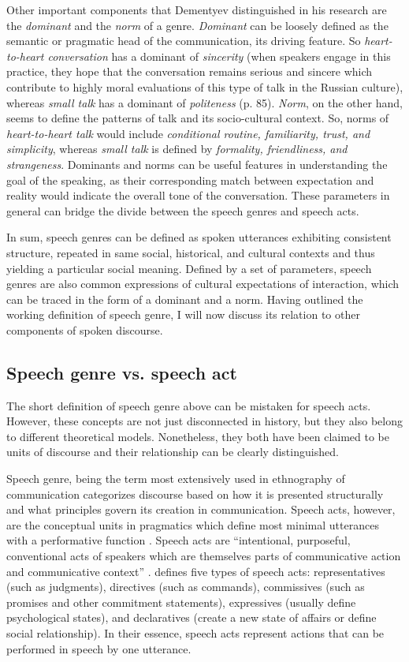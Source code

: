 \documentclass[12pt]{article}
\begin{document}
Other important components that Dementyev distinguished in his research are the \textit{dominant} and the \textit{norm} of a genre. \textit{Dominant} can be loosely defined as the semantic or pragmatic head of the communication, its driving feature. So \textit{heart-to-heart conversation} has a dominant of \textit{sincerity} (when speakers engage in this practice, they hope that the conversation remains serious and sincere which contribute to highly moral evaluations of this type of talk in the Russian culture), whereas \textit{small talk} has a dominant of \textit{politeness} (p. 85). \textit{Norm}, on the other hand, seems to define the patterns of talk and its socio-cultural context. So, norms of \textit{heart-to-heart talk} would include \textit{conditional routine, familiarity, trust, and simplicity}, whereas \textit{small talk} is defined by \textit{formality, friendliness, and strangeness}. Dominants and norms can be useful features in understanding the goal of the speaking, as their corresponding match between  expectation and reality would indicate the overall tone of the conversation. These parameters in general can bridge the divide between the speech genres and speech acts.

In sum, speech genres can be defined as spoken utterances exhibiting consistent structure, repeated in same social, historical, and cultural contexts and thus yielding a particular social meaning. Defined by a set of parameters, speech genres are also common expressions of cultural expectations of interaction, which can be traced in the form of a dominant and a norm. Having outlined the working definition of speech genre, I will now discuss its relation to other components of spoken discourse.
\subsection{Speech genre vs. speech act}
The short definition of speech genre above can be mistaken for speech acts. However, these concepts are not just disconnected in history, but they also belong to different theoretical models. Nonetheless, they both have been claimed to be units of discourse and their relationship can be clearly distinguished. 

Speech genre, being the term most extensively used in ethnography of communication  categorizes discourse based on how it is presented structurally and what principles govern its creation in communication. Speech acts, however, are the conceptual units in pragmatics which define most minimal utterances with a performative function \parencite{searle2011}.  Speech acts  are ``intentional, purposeful, conventional acts of speakers which are themselves parts of communicative action and communicative context'' \parencite[para. 7]{komleva2011}. \textcite{searle2011} defines five types of speech acts: representatives (such as judgments), directives (such as commands), commissives (such as promises and other commitment statements), expressives (usually define psychological states), and declaratives (create a new state of affairs or define social relationship). In their essence, speech acts represent actions that can be performed in speech by one utterance.
\end{document}
